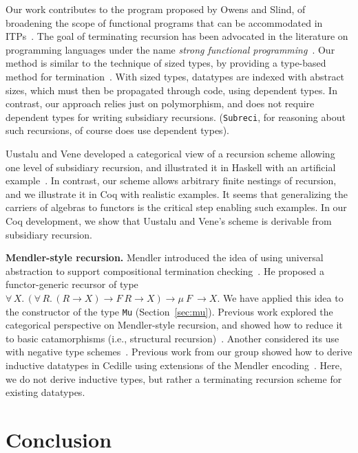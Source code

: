 \documentclass[a4paper,USenglish]{lipics-v2021}
\newcommand{\all}[2]{\forall\, #1.\, #2}
\begin{document}
Our work contributes to the program proposed by Owens and Slind, of
broadening the scope of functional programs that can be accommodated
in ITPs~\cite{owens+08}.  The goal of terminating recursion has been
advocated in the literature on programming languages under the name
\emph{strong functional programming}~\cite{turner95}.  Our method is
similar to the technique of sized types, by providing a type-based
method for termination~\cite{barthe04}.  With sized types, datatypes
are indexed with abstract sizes, which must then be propagated through
code, using dependent types.  In contrast, our approach relies just on
polymorphism, and does not require dependent types for writing
subsidiary recursions.  (\verb|Subreci|, for reasoning about such
recursions, of course does use dependent types).

Uustalu and Vene developed a categorical view of a recursion scheme
allowing one level of subsidiary recursion, and illustrated it in
Haskell with an artificial example~\cite{uustalu11}.  In contrast, our
scheme allows arbitrary finite nestings of recursion, and we
illustrate it in Coq with realistic examples.  It seems that
generalizing the carriers of algebras to functors is the critical step
enabling such examples. In our Coq development, we show that Uustalu
and Vene's scheme is derivable from subsidiary recursion.

\textbf{Mendler-style recursion.}  Mendler introduced the idea of
using universal abstraction to support compositional termination
checking~\cite{mendler91}.  He proposed a functor-generic recursor of
type $\all{X}{(\all{R}{(R \to X) \to F\ R \to X}) \to \mu\ F\ \to
  X}$. We have applied this idea to the constructor of the type
\verb|Mu| (Section~\ref{sec:mu}).  Previous work explored the
categorical perspective on Mendler-style recursion, and showed how to
reduce it to basic catamorphisms (i.e., structural
recursion)~\cite{uustalu99}.  Another considered its use with negative
type schemes~\cite{ahn11}.  Previous work from our group showed how to
derive inductive datatypes in Cedille using extensions of the Mendler
encoding~\cite{firsov+18b,firsov+18a}.  Here, we do not derive
inductive types, but rather
a terminating recursion scheme for existing datatypes.

\section{Conclusion}
\end{document}
